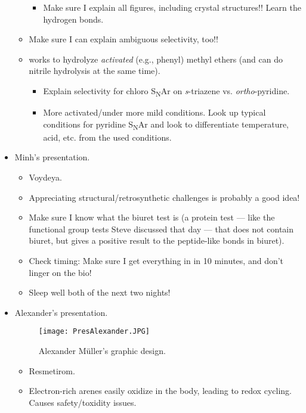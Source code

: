 \documentclass[../notes.tex]{subfiles}
\begin{document}
\begin{itemize}
\begin{itemize}
\begin{itemize}
            \item Make sure I explain all figures, including crystal structures!! Learn the hydrogen bonds.
        \end{itemize}
        \item Make sure I can explain ambiguous selectivity, too!!
        \item {} works to hydrolyze \emph{activated} (e.g., phenyl) methyl ethers (and can do nitrile hydrolysis at the same time).
        \begin{itemize}
            \item Explain selectivity for chloro S\textsubscript{N}Ar on \emph{s}-triazene vs. \emph{ortho}-pyridine.
            \item More activated/under more mild conditions. Look up typical conditions for pyridine S\textsubscript{N}Ar and look to differentiate temperature, acid, etc. from the used conditions.
        \end{itemize}
    \end{itemize}
    \item Minh's presentation.
    \begin{itemize}
        \item Voydeya.
        \item Appreciating structural/retrosynthetic challenges is probably a good idea!
        \item Make sure I know what the biuret test is (a protein test --- like the functional group tests Steve discussed that day --- that does not contain biuret, but gives a positive result to the peptide-like bonds in biuret).
        \item Check timing: Make sure I get everything in in 10 minutes, and don't linger on the bio!
        \item Sleep well both of the next two nights!
    \end{itemize}
    \item Alexander's presentation.
    \begin{figure}[h!]
        \centering
        \texttt{[image: PresAlexander.JPG]}
        \caption{Alexander M\"{u}ller's graphic design.}
        \label{fig:PresAlexander}
    \end{figure}
    \begin{itemize}
        \item Resmetirom.
        \item Electron-rich arenes easily oxidize in the body, leading to redox cycling. Causes safety/toxidity issues.

\end{itemize}
\end{itemize}
\end{document}

